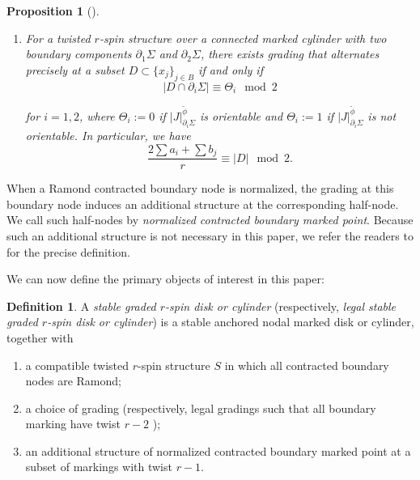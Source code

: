 \documentclass[11pt]{amsart}
\newtheorem{prop}[dummy]{Proposition}
\theoremstyle{definition}
\newtheorem{definition}[dummy]{Definition}
\theoremstyle{remark}
\newcommand{\<}{\left<}
\renewcommand{\>}{\right>}
\numberwithin{equation}{section}
\begin{document}
\begin{prop}[{\cite[Proposition 2.3]{BCT2}}]
\begin{enumerate}
\item\label{it lift compatible parity g=1}
For %
a twisted $r$-spin structure over a connected marked cylinder with two boundary components $\partial_1 \Sigma$ and $\partial_2 \Sigma$, there exists grading that alternates precisely at a subset $D \subset \{x_j\}_{j \in B}$ if and only if
\begin{equation}\label{eq boundarywise pairty}
    |D\cap \partial_i \Sigma| \equiv  \Theta_i \mod 2
\end{equation}

for $i=1,2$, where $\Theta_i:=0$ if $|J|^{\tilde\phi}_{\partial_i\Sigma}$ is orientable and $\Theta_i:=1$ if $|J|^{\tilde\phi}_{\partial_i\Sigma}$ is not orientable.
In particular, we have
\begin{equation}\label{eq compatitable pairty g=1}
   \frac{2\sum a_i + \sum b_j}{r} \equiv |D| \mod 2.
\end{equation}

\end{enumerate}
\end{prop}

When a Ramond contracted boundary node is normalized, the grading at this boundary node induces an additional structure at the corresponding half-node. We call such half-nodes by \textit{normalized contracted boundary marked point}. Because such an additional structure is not necessary in this paper, we refer the readers to \cite[Definition 2.5]{TZ1} for the precise definition. 



We can now define the primary objects of interest in %
this paper:

\begin{definition}
\label{def graded rspin disk}
A %
\textit{stable graded $r$-spin disk or cylinder} (respectively, \textit{legal stable graded $r$-spin disk or cylinder}) is %
a stable anchored nodal marked disk or cylinder, together with
\begin{enumerate}
\item a compatible twisted $r$-spin structure $S$ in which all contracted boundary nodes are Ramond;
\item a choice of grading (respectively, legal gradings such that all boundary marking have twist $r-2$ );

\item  an additional structure of normalized contracted boundary marked point at a subset of markings with twist $r-1$.

\end{enumerate}
\end{definition}
\end{document}

